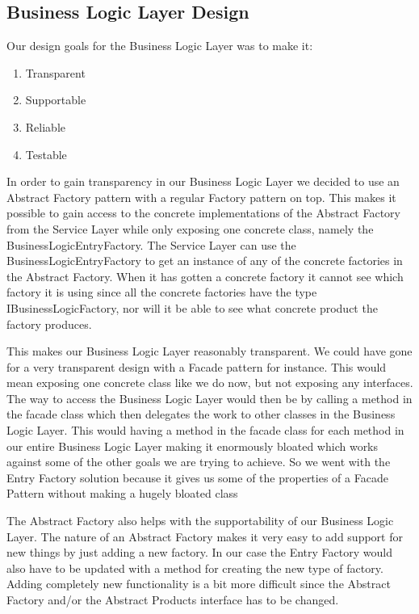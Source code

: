 \documentclass[../report.tex]{subfiles}
\begin{document}
\graphicspath{{img/}{../img/}}

\subsection{Business Logic Layer Design}

Our design goals for the Business Logic Layer was to make it:
\begin{enumerate}
\item Transparent
\item Supportable
\item Reliable
\item Testable
\end{enumerate}

In order to gain transparency in our Business Logic Layer we decided to use an Abstract Factory pattern with a regular Factory pattern on top. This makes it possible to gain access to the concrete implementations of the Abstract Factory from the Service Layer while only exposing one concrete class, namely the BusinessLogicEntryFactory. The Service Layer can use the BusinessLogicEntryFactory to get an instance of any of the concrete factories in the Abstract Factory. When it has gotten a concrete factory it cannot see which factory it is using since all the concrete factories have the type IBusinessLogicFactory, nor will it be able to see what concrete product the factory produces.

This makes our Business Logic Layer reasonably transparent. We could have gone for a very transparent design with a Facade pattern for instance. This would mean exposing one concrete class like we do now, but not exposing any interfaces. The way to access the Business Logic Layer would then be by calling a method in the facade class which then delegates the work to other classes in the Business Logic Layer. This would having a method in the facade class for each method in our entire Business Logic Layer making it enormously bloated which works against some of the other goals we are trying to achieve. So we went with the Entry Factory solution because it gives us some of the properties of a Facade Pattern without making a hugely bloated class

The Abstract Factory also helps with the supportability of our Business Logic Layer. The nature of an Abstract Factory makes it very easy to add support for new things by just adding a new factory. In our case the Entry Factory would also have to be updated with a method for creating the new type of factory. Adding completely new functionality is a bit more difficult since the Abstract Factory and/or the Abstract Products interface has to be changed. 
\end{document}
